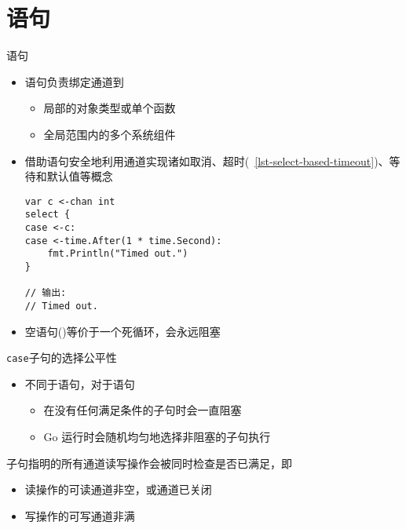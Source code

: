 \section{\select 语句}
\begin{frame}[fragile]{\select 语句}
    \begin{itemize}
        \item \select 语句负责绑定通道到
            \begin{itemize}
                \item 局部的对象类型或单个函数
                \item 全局范围内的多个系统组件
            \end{itemize}
        \item 借助\select 语句安全地利用通道实现诸如\alert{取消}、\alert{超时}(\lstlistingname~\ref{lst-select-based-timeout})、\alert{等待}和\alert{默认值}等概念
\begin{lstlisting}[caption={基于\select 实现超时退出},label=lst-select-based-timeout]
var c <-chan int
select {
case <-c:
case <-time.After(1 * time.Second):
    fmt.Println("Timed out.")
}

// 输出:
// Timed out.
\end{lstlisting}
        \item<2-> \textcolor{example}{空\select 语句()等价于一个死循环，会永远阻塞}
    \end{itemize}

    
\end{frame}

\begin{frame}{\texttt{case}子句的选择公平性}
    \begin{itemize}
        \item 不同于语句，对于\select 语句
            \begin{itemize}
                \item 在没有任何满足条件的子句时会一直阻塞
                \item Go 运行时会随机均匀地选择非阻塞的子句执行
            \end{itemize}
    \end{itemize}

    \bigskip
    子句指明的所有通道读写操作会被同时检查是否已满足，即
    \begin{itemize}
        \item 读操作的可读通道非空，或通道已关闭 
        \item 写操作的可写通道非满
    \end{itemize}
\end{frame}

